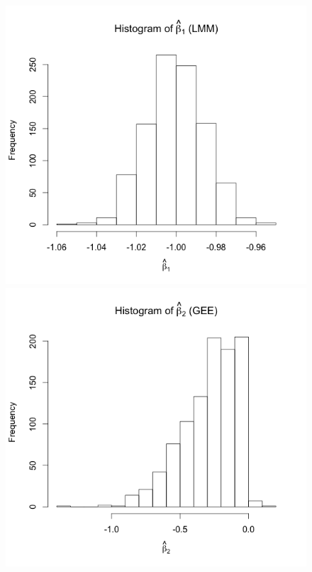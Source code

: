 \documentclass[11pt]{article}
\begin{document}
\begin{enumerate}
\begin{enumerate}
\begin{figure}[H]
				\includegraphics[scale=0.4]{Rplot4b1LMM}
				\includegraphics[scale=0.4]{Rplot4b2GEE}

\end{figure}
\end{enumerate}
\end{enumerate}
\end{document}
